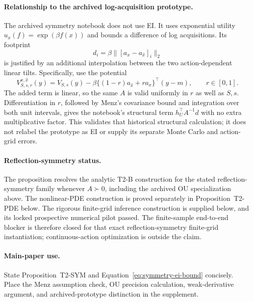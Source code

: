 \paragraph{Relationship to the archived log-acquisition prototype.}
The archived symmetry notebook does not use EI.  It uses exponential utility
$u_x(f)=\exp(\beta f(x))$ and bounds a difference of log acquisitions.  Its
footprint
\[
 d_i=\beta\|[a_x-a_{\widehat x}]_i\|_2
\]
is justified by an additional interpolation between the two action-dependent
linear tilts.  Specifically, use the potential
\[
 V_{S,s,r}^{x,\widehat x}(y)
 =V_{S,s}(y)
 -\beta\{(1-r)a_{\widehat x}+r a_x\}^\top(y-m),
 \qquad r\in[0,1].
\]
The added term is linear, so the same $A$ is valid uniformly in $r$ as well as
$S,s$.  Differentiation in $r$, followed by Menz's covariance bound and
integration over both unit intervals, gives the notebook's structural term
$h_U^\top A^{-1}d$ with no extra multiplicative factor.  This validates that
historical structural calculation; it does not relabel the prototype as EI or
supply its separate Monte Carlo and action-grid errors.

\paragraph{Reflection-symmetry status.}
The proposition resolves the analytic T2-B construction for the stated
reflection-symmetry family whenever $A\succ0$, including the archived OU
specialization above.  The nonlinear-PDE construction is proved separately in
Proposition~T2-PDE below.  The rigorous finite-grid inference construction is
supplied below, and its locked prospective numerical pilot passed.  The
finite-sample end-to-end blocker is therefore closed for that exact
reflection-symmetry finite-grid instantiation; continuous-action optimization
is outside the claim.

\paragraph{Main-paper use.}
State Proposition~T2-SYM and Equation~\eqref{eq:symmetry-ei-bound} concisely.
Place the Menz assumption check, OU precision calculation, weak-derivative
argument, and archived-prototype distinction in the supplement.

